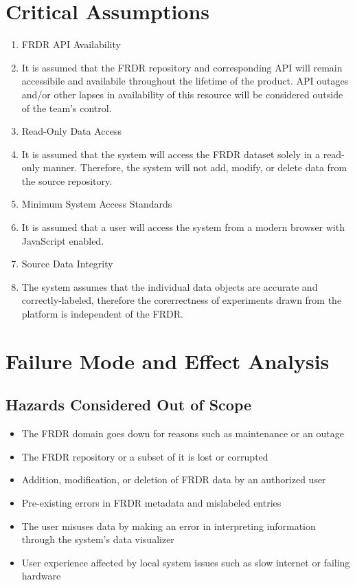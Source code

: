 \documentclass{article}
\begin{document}
\section{Critical Assumptions}



\begin{enumerate}
    \item FRDR API Availability
    \item[] It is assumed that the FRDR repository and corresponding API will remain accessibile and availabile throughout the lifetime of the product. API outages and/or other lapses in availability of this resource will be considered outside of the team's control. 
    \item Read-Only Data Access
    \item[] It is assumed that the system will access the FRDR dataset solely in a read-only manner. Therefore, the system will not add, modify, or delete data from the source repository. 
    \item Minimum System Access Standards
    \item[] It is assumed that a user will access the system from a modern browser with JavaScript enabled. 
    \item Source Data Integrity 
    \item [] The system assumes that the individual data objects are accurate and correctly-labeled, therefore the corerrectness of experiments drawn from the platform is independent of the FRDR. 
\end{enumerate}

\section{Failure Mode and Effect Analysis}

\subsection{Hazards Considered Out of Scope}

\begin{itemize}
    \item The FRDR domain goes down for reasons such as maintenance or an outage
    \item The FRDR repository or a subset of it is lost or corrupted
    \item Addition, modification, or deletion of FRDR data by an authorized user
    \item Pre-existing errors in FRDR metadata and mislabeled entries
    \item The user misuses data by making an error in interpreting information through the system's data visualizer
    \item User experience affected by local system issues such as slow internet or failing hardware
\end{itemize}
\end{document}
